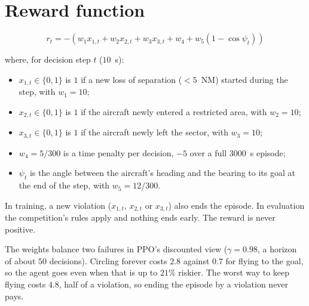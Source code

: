 \documentclass[11pt]{article}
\begin{document}
\section*{Reward function}

\begin{equation}
r_t = -\left( w_1 x_{1,t} + w_2 x_{2,t} + w_3 x_{3,t} + w_4 + w_5 \left(1 - \cos \psi_t\right) \right)
\end{equation}

\noindent where, for decision step $t$ ($10$~s):
\begin{itemize}
    \item $x_{1,t} \in \{0,1\}$ is $1$ if a new loss of separation ($< 5$~NM) started during the step, with $w_1 = 10$;
    \item $x_{2,t} \in \{0,1\}$ is $1$ if the aircraft newly entered a restricted area, with $w_2 = 10$;
    \item $x_{3,t} \in \{0,1\}$ is $1$ if the aircraft newly left the sector, with $w_3 = 10$;
    \item $w_4 = 5/300$ is a time penalty per decision, $-5$ over a full $3000$~s episode;
    \item $\psi_t$ is the angle between the aircraft's heading and the bearing to its goal at the end of the step, with $w_5 = 12/300$.
\end{itemize}

\noindent In training, a new violation ($x_{1,t}$, $x_{2,t}$ or $x_{3,t}$) also ends the episode. In evaluation the competition's rules apply and nothing ends early. The reward is never positive.

\noindent The weights balance two failures in PPO's discounted view ($\gamma = 0.98$, a horizon of about $50$ decisions). Circling forever costs $2.8$ against $0.7$ for flying to the goal, so the agent goes even when that is up to $21\%$ riskier. The worst way to keep flying costs $4.8$, half of a violation, so ending the episode by a violation never pays.
\end{document}
